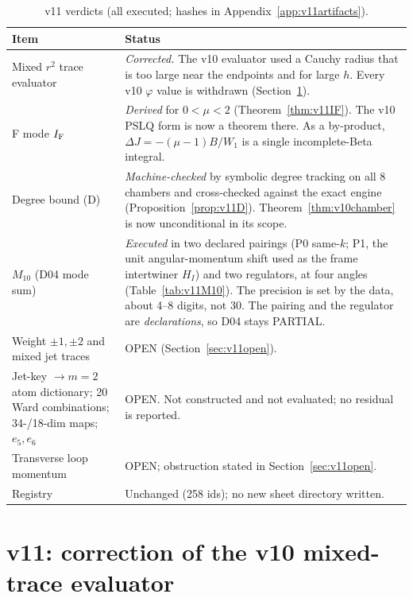 \documentclass[11pt,a4paper]{article}
\newcommand{\OPEN}{\textsf{OPEN}}
\newcommand{\PARTIAL}{\textsf{PARTIAL}}
\theoremstyle{plain}
\theoremstyle{definition}
\theoremstyle{remark}
\numberwithin{equation}{section}
\begin{document}
\begin{center}
\small
\begin{longtable}{@{}L{.30\linewidth}L{.62\linewidth}@{}}
\caption{v11 verdicts (all executed; hashes in Appendix~\ref{app:v11artifacts}).}\label{tab:v11verdict}\\
\toprule
Item & Status\\
\midrule
Mixed \(r^2\) trace evaluator & \emph{Corrected.} The v10 evaluator used a Cauchy radius that is too large near the endpoints and for large \(h\). Every v10 \(\varphi\) value is withdrawn (Section~\ref{sec:v11bug}).\\
F mode \(I_{\rm F}\) & \emph{Derived} for \(0<\mu<2\) (Theorem~\ref{thm:v11IF}). The v10 PSLQ form is now a theorem there. As a by-product, \(\Delta J=-(\mu-1)B/W_1\) is a single incomplete-Beta integral.\\
Degree bound (D) & \emph{Machine-checked} by symbolic degree tracking on all 8 chambers and cross-checked against the exact engine (Proposition~\ref{prop:v11D}). Theorem~\ref{thm:v10chamber} is now unconditional in its scope.\\
\(M_{10}\) (D04 mode sum) & \emph{Executed} in two declared pairings (P0 same-\(k\); P1, the unit angular-momentum shift used as the frame intertwiner \(H_I\)) and two regulators, at four angles (Table~\ref{tab:v11M10}). The precision is set by the data, about 4--8 digits, not 30. The pairing and the regulator are \emph{declarations}, so D04 stays \PARTIAL.\\
Weight \(\pm1,\pm2\) and mixed jet traces & \OPEN{} (Section~\ref{sec:v11open}).\\
Jet-key \(\to m=2\) atom dictionary; 20 Ward combinations; 34-/18-dim maps; \(e_5,e_6\) & \OPEN. Not constructed and not evaluated; no residual is reported.\\
Transverse loop momentum & \OPEN; obstruction stated in Section~\ref{sec:v11open}.\\
Registry & Unchanged (258 ids); no new sheet directory written.\\
\bottomrule
\end{longtable}
\end{center}

\section{v11: correction of the v10 mixed-trace evaluator}
\label{sec:v11bug}
\end{document}
